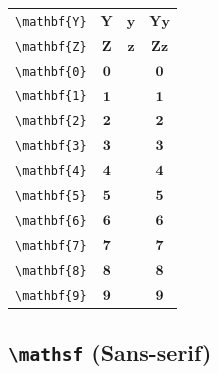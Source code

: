 \documentclass[12pt,a4paper]{article}
\begin{document}
\begin{longtable}{|c|c|c|c|}
\verb|\mathbf{Y}| & $\mathbf{Y}$ & $\mathbf{y}$ & $ 𝐘 𝐲 $ \\
\verb|\mathbf{Z}| & $\mathbf{Z}$ & $\mathbf{z}$ & $ 𝐙 𝐳 $ \\
\verb|\mathbf{0}| & $\mathbf{0}$ & & $ 𝟎 $ \\
\verb|\mathbf{1}| & $\mathbf{1}$ & & $ 𝟏 $ \\
\verb|\mathbf{2}| & $\mathbf{2}$ & & $ 𝟐 $ \\
\verb|\mathbf{3}| & $\mathbf{3}$ & & $ 𝟑 $ \\
\verb|\mathbf{4}| & $\mathbf{4}$ & & $ 𝟒 $ \\
\verb|\mathbf{5}| & $\mathbf{5}$ & & $ 𝟓 $ \\
\verb|\mathbf{6}| & $\mathbf{6}$ & & $ 𝟔 $ \\
\verb|\mathbf{7}| & $\mathbf{7}$ & & $ 𝟕 $ \\
\verb|\mathbf{8}| & $\mathbf{8}$ & & $ 𝟖 $ \\
\verb|\mathbf{9}| & $\mathbf{9}$ & & $ 𝟗 $ \\
\hline
\end{longtable}

\newpage

\subsection*{\texttt{\textbackslash{}mathsf} (Sans-serif)}
\end{document}

